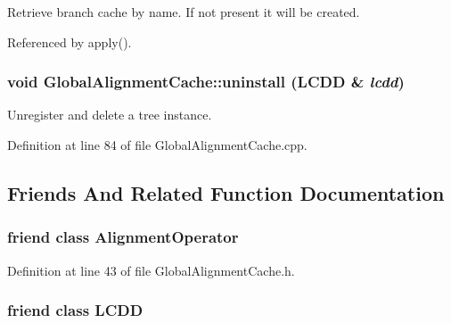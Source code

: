 Retrieve branch cache by name. If not present it will be created. 

Referenced by apply().\hypertarget{class_d_d4hep_1_1_alignments_1_1_global_alignment_cache_a8522b477a1db233bc330cc3c546dd9e7}{
\subsubsection[{uninstall}]{\setlength{\rightskip}{0pt plus 5cm}void GlobalAlignmentCache::uninstall (LCDD \& {\em lcdd})}}
\label{class_d_d4hep_1_1_alignments_1_1_global_alignment_cache_a8522b477a1db233bc330cc3c546dd9e7}


Unregister and delete a tree instance. 

Definition at line 84 of file GlobalAlignmentCache.cpp.

\subsection{Friends And Related Function Documentation}
\hypertarget{class_d_d4hep_1_1_alignments_1_1_global_alignment_cache_a0123c592b59946302df6795784a503e4}{
\subsubsection[{AlignmentOperator}]{\setlength{\rightskip}{0pt plus 5cm}friend class {\bf AlignmentOperator}}}
\label{class_d_d4hep_1_1_alignments_1_1_global_alignment_cache_a0123c592b59946302df6795784a503e4}


Definition at line 43 of file GlobalAlignmentCache.h.\hypertarget{class_d_d4hep_1_1_alignments_1_1_global_alignment_cache_a7e41b5a9f3843a7e39b0a2f9d618ae4a}{
\subsubsection[{LCDD}]{\setlength{\rightskip}{0pt plus 5cm}friend class LCDD}}
\label{class_d_d4hep_1_1_alignments_1_1_global_alignment_cache_a7e41b5a9f3843a7e39b0a2f9d618ae4a}


